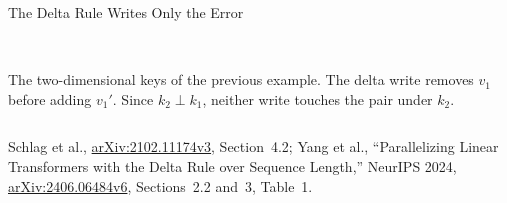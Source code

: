\begin{frame}{The Delta Rule Writes Only the Error}
\begin{columns}[T,onlytextwidth]
\\[0.4em]
      {\scriptsize The two-dimensional keys of the previous example. The delta write removes $v_1$ before adding $v_1'$. Since $k_2 \perp k_1$, neither write touches the pair under $k_2$.}
  \end{columns}
  \vspace{0.1em}
  {\scriptsize Schlag et al., \href{https://arxiv.org/abs/2102.11174v3}{arXiv:2102.11174v3}, Section~4.2; Yang et al., ``Parallelizing Linear Transformers with the Delta Rule over Sequence Length,'' NeurIPS 2024, \href{https://arxiv.org/abs/2406.06484v6}{arXiv:2406.06484v6}, Sections~2.2 and~3, Table~1.}
\end{frame}

